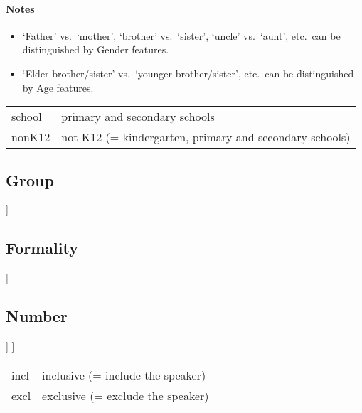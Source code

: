 \documentclass[12pt]{article}
\begin{document}
\paragraph{Notes}
\begin{itemize}
	\item `Father' vs.~`mother', `brother' vs.~`sister', `uncle' vs.~`aunt', etc.~can be distinguished by Gender features.
	\item `Elder brother/sister' vs.~`younger brother/sister', etc.~can be distinguished by Age features.
\end{itemize}

\begin{tabular}[!h]{ll}
	\toprule
	\textsf{school} & primary and secondary schools\\
	\textsf{nonK12} & not K12 (= kindergarten, primary and secondary schools)\\
	\bottomrule
\end{tabular}

\subsection{Group}
\begin{forest}
	[
		[\textsf{foreigner}]
		[\textsf{local}]
	]
\end{forest}

\subsection{Formality}
\begin{forest}
	[
		[\textsf{formal}]
		[\textsf{informal}]
	]
\end{forest}

\subsection{Number}
\begin{forest}
	[
		[\textsf{sg}]
		[\textsf{pl}
			[\textsf{incl}]
			[\textsf{excl}]
		]
	]
\end{forest}

\begin{tabular}[!h]{ll}
	\toprule
	\textsf{incl} & inclusive (= include the speaker)\\
	\textsf{excl} & exclusive (= exclude the speaker)\\
	\bottomrule
\end{tabular}
\end{document}
